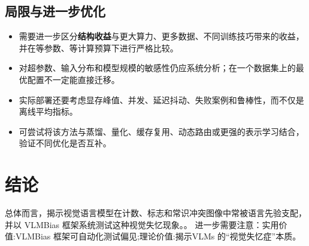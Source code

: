 \documentclass[UTF8,11pt,a4paper]{ctexart}
\newcommand{\term}[1]{\textbf{\textcolor{mainblue}{#1}}}
\begin{document}
\subsection{局限与进一步优化}
\begin{itemize}
\item 需要进一步区分\term{结构收益}与更大算力、更多数据、不同训练技巧带来的收益，并在等参数、等计算预算下进行严格比较。
\item 对超参数、输入分布和模型规模的敏感性仍应系统分析；在一个数据集上的最优配置不一定能直接迁移。
\item 实际部署还要考虑显存峰值、并发、延迟抖动、失败案例和鲁棒性，而不仅是离线平均指标。
\item 可尝试将该方法与蒸馏、量化、缓存复用、动态路由或更强的表示学习结合，验证不同优化是否互补。
\end{itemize}

\section{结论}
总体而言，揭示视觉语言模型在计数、标志和常识冲突图像中常被语言先验支配，并以 VLMBias 框架系统测试这种视觉失忆现象。。 进一步需要注意：实用价值:VLMBias 框架可自动化测试偏见;理论价值:揭示VLMs 的“视觉失忆症”本质。
\end{document}
